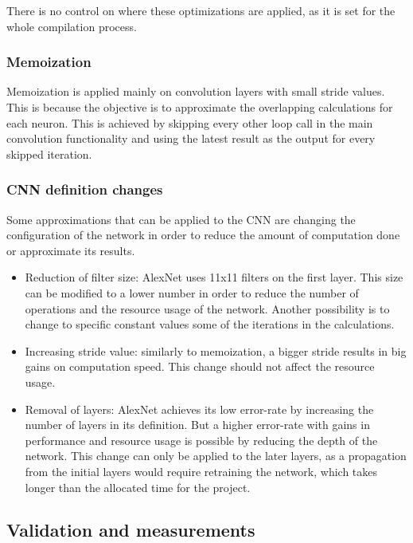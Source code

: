 \begin{enumerate}
There is no control on where these optimizations are applied, as it is set for the whole
compilation process.

\subsubsection{Memoization}

Memoization is applied mainly on convolution layers with small stride values. This is because
the objective is to approximate the overlapping calculations for each neuron. This is achieved
by skipping every other loop call in the main convolution functionality and using the latest
result as the output for every skipped iteration.

\subsubsection{CNN definition changes}

Some approximations that can be applied to the CNN are changing the configuration of the network
in order to reduce the amount of computation done or approximate its results.

\begin{itemize}
    \item Reduction of filter size: AlexNet uses 11{x}11 filters on the first layer. This size
    can be modified to a lower number in order to reduce the number of operations and the
    resource usage of the network. Another
    possibility is to change to specific constant values some of the iterations in the calculations.
    \item Increasing stride value: similarly to memoization, a bigger stride results in big gains
    on computation speed. This change should not affect the resource usage.
    \item Removal of layers: AlexNet achieves its low error-rate by increasing the number of layers
    in its definition. But a higher error-rate with gains in performance and resource usage is
    possible by reducing the depth of the network. This change can only be applied to the later
    layers, as a propagation from the initial layers would require retraining the network, which
    takes longer than the allocated time for the project.
\end{itemize}

\subsection{Validation and measurements}


\end{enumerate}
